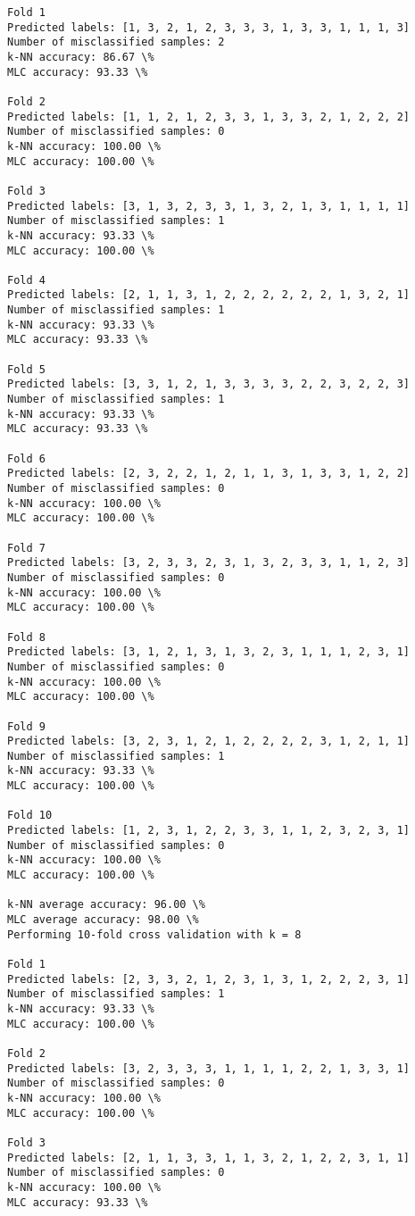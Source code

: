 \documentclass[11pt]{article}
\begin{document}
\begin{Verbatim}[commandchars=\\\{\}]
Fold 1
Predicted labels: [1, 3, 2, 1, 2, 3, 3, 3, 1, 3, 3, 1, 1, 1, 3]
Number of misclassified samples: 2
k-NN accuracy: 86.67 \%
MLC accuracy: 93.33 \%

Fold 2
Predicted labels: [1, 1, 2, 1, 2, 3, 3, 1, 3, 3, 2, 1, 2, 2, 2]
Number of misclassified samples: 0
k-NN accuracy: 100.00 \%
MLC accuracy: 100.00 \%

Fold 3
Predicted labels: [3, 1, 3, 2, 3, 3, 1, 3, 2, 1, 3, 1, 1, 1, 1]
Number of misclassified samples: 1
k-NN accuracy: 93.33 \%
MLC accuracy: 100.00 \%

Fold 4
Predicted labels: [2, 1, 1, 3, 1, 2, 2, 2, 2, 2, 2, 1, 3, 2, 1]
Number of misclassified samples: 1
k-NN accuracy: 93.33 \%
MLC accuracy: 93.33 \%

Fold 5
Predicted labels: [3, 3, 1, 2, 1, 3, 3, 3, 3, 2, 2, 3, 2, 2, 3]
Number of misclassified samples: 1
k-NN accuracy: 93.33 \%
MLC accuracy: 93.33 \%

Fold 6
Predicted labels: [2, 3, 2, 2, 1, 2, 1, 1, 3, 1, 3, 3, 1, 2, 2]
Number of misclassified samples: 0
k-NN accuracy: 100.00 \%
MLC accuracy: 100.00 \%

Fold 7
Predicted labels: [3, 2, 3, 3, 2, 3, 1, 3, 2, 3, 3, 1, 1, 2, 3]
Number of misclassified samples: 0
k-NN accuracy: 100.00 \%
MLC accuracy: 100.00 \%

Fold 8
Predicted labels: [3, 1, 2, 1, 3, 1, 3, 2, 3, 1, 1, 1, 2, 3, 1]
Number of misclassified samples: 0
k-NN accuracy: 100.00 \%
MLC accuracy: 100.00 \%

Fold 9
Predicted labels: [3, 2, 3, 1, 2, 1, 2, 2, 2, 2, 3, 1, 2, 1, 1]
Number of misclassified samples: 1
k-NN accuracy: 93.33 \%
MLC accuracy: 100.00 \%

Fold 10
Predicted labels: [1, 2, 3, 1, 2, 2, 3, 3, 1, 1, 2, 3, 2, 3, 1]
Number of misclassified samples: 0
k-NN accuracy: 100.00 \%
MLC accuracy: 100.00 \%

k-NN average accuracy: 96.00 \%
MLC average accuracy: 98.00 \%
Performing 10-fold cross validation with k = 8

Fold 1
Predicted labels: [2, 3, 3, 2, 1, 2, 3, 1, 3, 1, 2, 2, 2, 3, 1]
Number of misclassified samples: 1
k-NN accuracy: 93.33 \%
MLC accuracy: 100.00 \%

Fold 2
Predicted labels: [3, 2, 3, 3, 3, 1, 1, 1, 1, 2, 2, 1, 3, 3, 1]
Number of misclassified samples: 0
k-NN accuracy: 100.00 \%
MLC accuracy: 100.00 \%

Fold 3
Predicted labels: [2, 1, 1, 3, 3, 1, 1, 3, 2, 1, 2, 2, 3, 1, 1]
Number of misclassified samples: 0
k-NN accuracy: 100.00 \%
MLC accuracy: 93.33 \%


\end{Verbatim}
\end{document}

